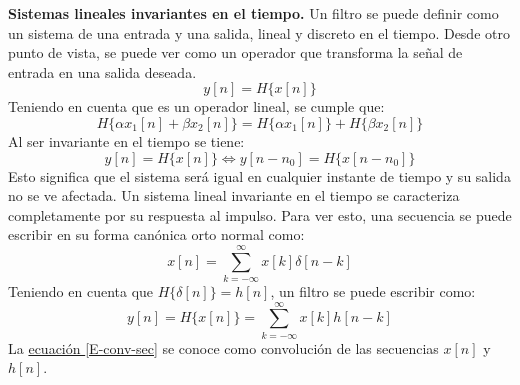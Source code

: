 \documentclass[11pt,lettersize]{article} %
\newcommand{\ecuacion}[1]{\hyperref[{#1}]{ecuación \ref*{#1}}}
\begin{document}
\textbf{Sistemas lineales invariantes en el tiempo.}
Un filtro se puede definir como un sistema de una entrada y una salida, lineal y discreto en el tiempo. Desde otro punto de vista, se puede ver como un operador que transforma la señal de entrada en una salida deseada.
\begin{equation}
	y[n] = H\{x[n]\}
\end{equation}
Teniendo en cuenta que es un operador lineal, se cumple que:
\begin{equation}
	H\{\alpha x_{1}[n] + \beta x_{2}[n]\} = H\{\alpha x_{1}[n]\} + H\{\beta x_{2}[n]\}
\end{equation}
Al ser invariante en el tiempo se tiene:
\begin{equation}
	y[n] = H\{x[n]\} \Longleftrightarrow y[n-n_{0}] = H\{x[n-n_{0}]\}
\end{equation}
Esto significa que el sistema será igual en cualquier instante de tiempo y su salida no se ve afectada. Un sistema lineal invariante en el tiempo se caracteriza completamente por su respuesta al impulso. Para ver esto, una secuencia se puede escribir en su forma canónica orto normal como:
\begin{equation}
	x[n] = \sum_{k=-\infty}^{\infty} x[k]\delta[n-k]
\end{equation}
Teniendo en cuenta que $H\{\delta[n]\} = h[n]$, un filtro se puede escribir como:
\begin{equation}
	y[n] = H\{x[n]\} =  \sum_{k=-\infty}^{\infty} x[k]h[n-k]
	\label{E-conv-sec}
\end{equation}
La \ecuacion{E-conv-sec} se conoce como convolución de las secuencias $x[n]$ y $h[n]$.
\end{document}
